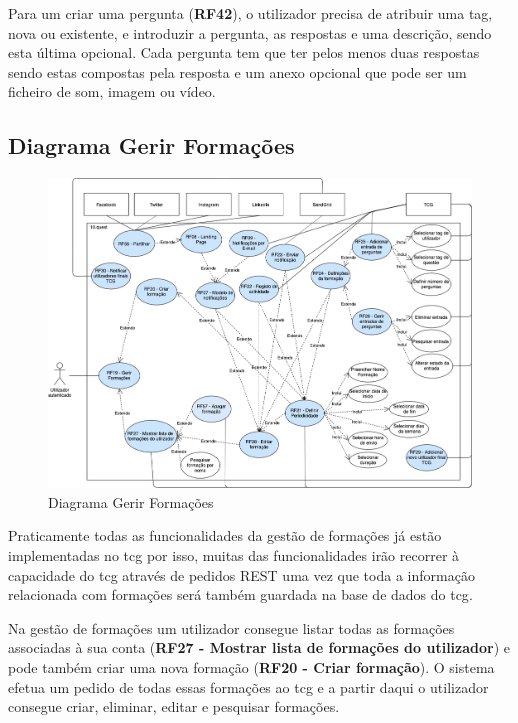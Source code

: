 Para um criar uma pergunta (\textbf{RF42}), o utilizador precisa de atribuir uma tag, nova ou existente, e introduzir a pergunta, as respostas e uma descrição, sendo esta última opcional. Cada pergunta tem que ter pelos menos duas respostas sendo estas compostas pela resposta e um anexo opcional que pode ser um ficheiro de som, imagem ou vídeo.



\newpage

\subsection{Diagrama Gerir Formações}
\label{d:formacoes}
\begin{figure}[ht!]
	\begin{center}
		\includegraphics[width=1\textwidth]{img/rf/gerir-formacoes}
		\caption{Diagrama Gerir Formações}
		\label{fig:rf-gerir-formacoes}
	\end{center}
\end{figure}

Praticamente todas as funcionalidades da gestão de formações já estão implementadas no \acrshort{tcg} por isso, muitas das funcionalidades irão recorrer à capacidade do \acrshort{tcg} através de pedidos REST uma vez que toda a informação relacionada com formações será também guardada na base de dados do \acrshort{tcg}.

Na gestão de formações um utilizador consegue listar todas as formações associadas à sua conta (\textbf{RF27 - Mostrar lista de formações do utilizador}) e pode também criar uma nova formação (\textbf{RF20 - Criar formação}). O sistema efetua um pedido de todas essas formações ao \acrshort{tcg} e a partir daqui o utilizador consegue criar, eliminar, editar e pesquisar formações.

